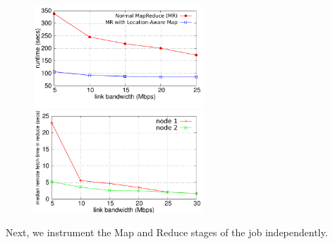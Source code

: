 \begin{figure}[ht]
	\centering
	\begin{minipage}[b]{0.48\linewidth}
		\includegraphics[width=2.5in]{figs/job-time-localMap.pdf}
		\caption{}
		\label{fig:job-time-localMap}
	\end{minipage}
	\quad
	\begin{minipage}[b]{0.48\linewidth}
		\includegraphics[width=2.5in]{figs/reduce-time.pdf}
		\caption{}
		\label{fig:reduce-time}
	\end{minipage}
\end{figure}


Next, we instrument the Map and Reduce stages of the job independently.

